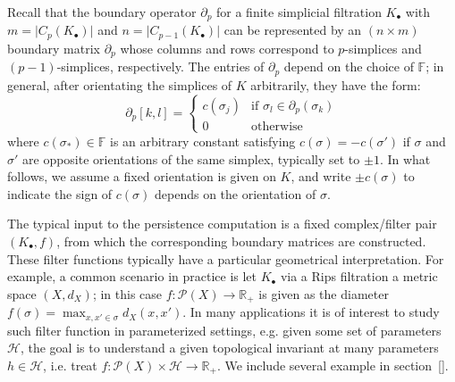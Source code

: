\documentclass[10pt]{article}
\newcommand{\+}{%
	\raisebox{0.18ex}{\scaleobj{0.55}{+}}
}
\begin{document}
Recall that the boundary operator $\partial_p$ for a finite simplicial filtration $K_{\bullet}$ with $m = \lvert C_p(K_{\bullet}) \rvert$ and $n = \lvert C_{p-1}(K_{\bullet}) \rvert$ can be represented by an $(n \times m)$ boundary matrix $\partial_p$ whose columns and rows correspond to $p$-simplices and $(p-1)$-simplices, respectively. The entries of $\partial_p$ depend on the choice of $\mathbb{F}$; in general, after orientating the simplices of $K$ arbitrarily, they have the form: 
\begin{equation}\label{eq:matrix_pchain}
	\partial_p[k, l] = \begin{cases} 
	c(\sigma_j)  & \text{if } \sigma_l \in \partial_p(\sigma_k) \\
	0 & \text{otherwise}
   \end{cases}
\end{equation}
where $c(\sigma_\ast) \in \mathbb{F}$ is an arbitrary constant satisfying $c(\sigma) = -c(\sigma')$ if $\sigma$ and $\sigma'$ are opposite orientations of the same simplex, typically set to $\pm 1$. In what follows, we assume a fixed orientation is given on $K$, and write $\pm c(\sigma)$ to indicate the sign of $c(\sigma)$ depends on the orientation of $\sigma$.  

The typical input to the persistence computation is a fixed complex/filter pair $(K_\bullet, f)$,  from which the corresponding boundary matrices are constructed. These filter functions typically have a particular geometrical interpretation. For example, a common scenario in practice is let $K_\bullet$ via a Rips filtration a metric space $(X, d_X)$; in this case $f : \mathcal{P}(X) \to \mathbb{R}_+$ is given as the diameter $f(\sigma) = \max_{x,x' \in \sigma} d_X(x,x')$. 
In many applications it is of interest to study such filter function in parameterized settings, e.g. given some set of parameters $\mathcal{H}$, the goal is to understand a given topological invariant at many  parameters $h \in \mathcal{H}$, i.e. treat $f : \mathcal{P}(X) \times \mathcal{H} \to \mathbb{R}_+$. We include several example in section~\ref{}.
\end{document}
